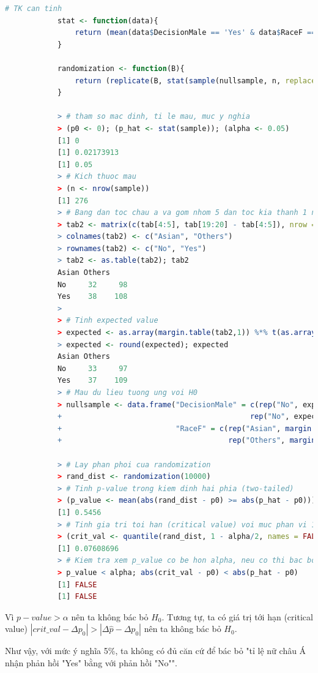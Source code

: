 \documentclass[a4paper,12pt]{article}
\begin{document}
			\begin{lstlisting}[language=R]
			# TK can tinh
			stat <- function(data){
				return (mean(data$DecisionMale == 'Yes' & data$RaceF == 'Asian') - mean(data$DecisionMale == 'No' & data$RaceF == 'Asian')) # Ti le khac biet
			}
			
			randomization <- function(B){
				return (replicate(B, stat(sample(nullsample, n, replace = TRUE))))
			}
			
			> # tham so mac dinh, ti le mau, muc y nghia
			> (p0 <- 0); (p_hat <- stat(sample)); (alpha <- 0.05)
			[1] 0
			[1] 0.02173913
			[1] 0.05
			> # Kich thuoc mau
			> (n <- nrow(sample))
			[1] 276
			> # Bang dan toc chau a va gom nhom 5 dan toc kia thanh 1 nhom
			> tab2 <- matrix(c(tab[4:5], tab[19:20] - tab[4:5]), nrow = 2, byrow = FALSE)
			> colnames(tab2) <- c("Asian", "Others")
			> rownames(tab2) <- c("No", "Yes")
			> tab2 <- as.table(tab2); tab2
			Asian Others
			No     32     98
			Yes    38    108
			> 
			> # Tinh expected value
			> expected <- as.array(margin.table(tab2,1)) %*% t(as.array(margin.table(tab2,2))) / margin.table(tab2)
			> expected <- round(expected); expected
			Asian Others
			No     33     97
			Yes    37    109
			> # Mau du lieu tuong ung voi H0
			> nullsample <- data.frame("DecisionMale" = c(rep("No", expected[1]), rep("Yes", expected[2]), 
			+                                           rep("No", expected[3]), rep("Yes", expected[4])), 
			+                          "RaceF" = c(rep("Asian", margin.table(tab2, 2)[1]), 
			+                                      rep("Others", margin.table(tab2, 2)[2]))) 
			 
			> # Lay phan phoi cua randomization
			> rand_dist <- randomization(10000)
			> # Tinh p-value trong kiem dinh hai phia (two-tailed)
			> (p_value <- mean(abs(rand_dist - p0) >= abs(p_hat - p0)))
			[1] 0.5456
			> # Tinh gia tri toi han (critical value) voi muc phan vi 1-alpha/2
			> (crit_val <- quantile(rand_dist, 1 - alpha/2, names = FALSE))
			[1] 0.07608696
			> # Kiem tra xem p_value co be hon alpha, neu co thi bac bo H0
			> p_value < alpha; abs(crit_val - p0) < abs(p_hat - p0)
			[1] FALSE
			[1] FALSE
			\end{lstlisting}
			
			Vì $p-value > \alpha$ nên ta không bác bỏ $H_0$. Tương tự, ta có giá trị tới hạn (critical value) $|crit\_val - \Delta p_0| > |\Delta\hat{p} - \Delta p_0|$ nên ta không bác bỏ $H_0$.
			
			Như vậy, với mức ý nghĩa 5\%, ta không có đủ căn cứ để bác bỏ "tỉ lệ nữ châu Á nhận phản hồi "Yes" bằng với phản hồi "No"".
		
\end{document}
